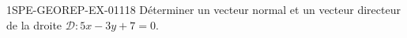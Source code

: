 \begin{exercice}{1SPE-GEOREP-EX-011}{1}{8}
Déterminer un vecteur normal et un vecteur directeur de la droite $\mathcal{D} : 5x - 3y + 7 = 0$.
\end{exercice}
